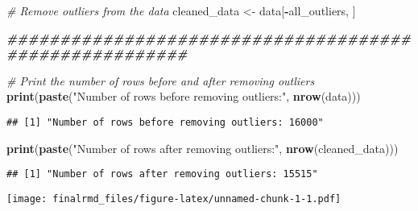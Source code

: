 \documentclass[
]{article}
\newenvironment{Shaded}{\begin{snugshade}}{\end{snugshade}}
\newcommand{\AttributeTok}[1]{\textcolor[rgb]{0.13,0.29,0.53}{#1}}
\newcommand{\CommentTok}[1]{\textcolor[rgb]{0.56,0.35,0.01}{\textit{#1}}}
\newcommand{\DecValTok}[1]{\textcolor[rgb]{0.00,0.00,0.81}{#1}}
\newcommand{\DocumentationTok}[1]{\textcolor[rgb]{0.56,0.35,0.01}{\textbf{\textit{#1}}}}
\newcommand{\FunctionTok}[1]{\textcolor[rgb]{0.13,0.29,0.53}{\textbf{#1}}}
\newcommand{\NormalTok}[1]{#1}
\newcommand{\OtherTok}[1]{\textcolor[rgb]{0.56,0.35,0.01}{#1}}
\newcommand{\SpecialCharTok}[1]{\textcolor[rgb]{0.81,0.36,0.00}{\textbf{#1}}}
\newcommand{\StringTok}[1]{\textcolor[rgb]{0.31,0.60,0.02}{#1}}
\begin{document}
\begin{Shaded}
\begin{Highlighting}[]
\CommentTok{\# Remove outliers from the data}
\NormalTok{cleaned\_data }\OtherTok{\textless{}{-}}\NormalTok{ data[}\SpecialCharTok{{-}}\NormalTok{all\_outliers, ]}

\DocumentationTok{\#\#\#\#\#\#\#\#\#\#\#\#\#\#\#\#\#\#\#\#\#\#\#\#\#\#\#\#\#\#\#\#\#\#\#\#\#\#\#\#\#\#\#\#\#\#\#\#\#\#\#\#\#\#\#}

\CommentTok{\# Print the number of rows before and after removing outliers}
\FunctionTok{print}\NormalTok{(}\FunctionTok{paste}\NormalTok{(}\StringTok{"Number of rows before removing outliers:"}\NormalTok{, }\FunctionTok{nrow}\NormalTok{(data)))}
\end{Highlighting}
\end{Shaded}

\begin{verbatim}
## [1] "Number of rows before removing outliers: 16000"
\end{verbatim}

\begin{Shaded}
\begin{Highlighting}[]
\FunctionTok{print}\NormalTok{(}\FunctionTok{paste}\NormalTok{(}\StringTok{"Number of rows after removing outliers:"}\NormalTok{, }\FunctionTok{nrow}\NormalTok{(cleaned\_data)))}
\end{Highlighting}
\end{Shaded}

\begin{verbatim}
## [1] "Number of rows after removing outliers: 15515"
\end{verbatim}

\begin{Shaded}
\end{Shaded}

\texttt{[image: finalrmd\_files/figure-latex/unnamed-chunk-1-1.pdf]}

\begin{Shaded}
\end{Shaded}
\end{document}
